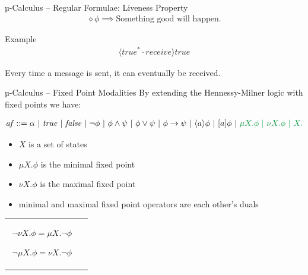 \documentclass[aspectratio=1610]{beamer}
\begin{document}
  \begin{frame}{µ-Calculus – Regular Formulae: Liveness Property}
    \begin{align*}
      \diamond\phi \implies \text{Something good will happen.}
    \end{align*}

    \begin{exampleblock}{Example}
      \begin{align*}
        [\mathit{true}^*\cdot \mathit{send}]\langle \mathit{true}^* \cdot \mathit{receive} \rangle \mathit{true}
      \end{align*}

      Every time a message is sent, it can eventually be received.
    \end{exampleblock}
  \end{frame}

  \begin{frame}{µ-Calculus – Fixed Point Modalities}
    By extending the Hennessy-Milner logic with fixed points we have:
    \resizebox{ \textwidth}{!} {
      \begin{minipage}{\textwidth}
        \begin{align*}
          \mathit{af} ::= \alpha\ |\ \mathit{true}\ |\ \mathit{false}\ |\ \neg \phi\ |\ \phi \land \psi\ |\ \phi \lor \psi\ |\ \phi \to \psi\ |\ \langle a \rangle \phi \ |\ [a]\phi\ |\ \color{green} \mu X. \phi \ |\ \nu X. \phi \ |\ X.
        \end{align*}
      \end{minipage}
    }
    \begin{itemize}
      \item $X$ is a set of states
      \item $\mu X. \phi$ is the minimal fixed point
      \item $\nu X. \phi$ is the maximal fixed point
      \item minimal and maximal fixed point operators are each other's duals
    \end{itemize}
    \begin{tabular}{cc}
      \begin{minipage}{.47\linewidth}
        \begin{align*}
          \neg \nu X. \phi = \mu X. \neg \phi
        \end{align*}
      \end{minipage}
      \begin{minipage}{.47\linewidth}
        \begin{align*}
          \neg \mu X. \phi = \nu X. \neg \phi
        \end{align*}
      \end{minipage}
    \end{tabular}
  \end{frame}
\end{document}
